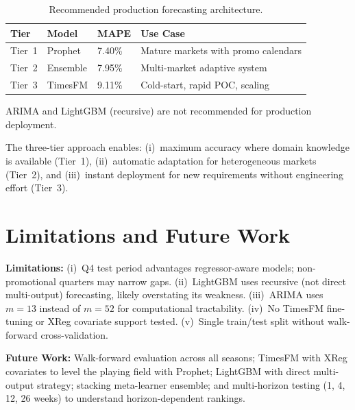 \documentclass[10pt,twocolumn,a4paper]{article}
\begin{document}
\begin{table}[t]
\caption{Recommended production forecasting architecture.}
\label{tab:deployment}
\setlength{\tabcolsep}{24pt}
\renewcommand{\arraystretch}{1.4}
\begin{tabular}{l l l l}
\toprule
\textbf{Tier} & \textbf{Model} & \textbf{MAPE} & \textbf{Use Case} \\
\midrule
Tier~1 & Prophet & 7.40\% & Mature markets with promo calendars \\
Tier~2 & Ensemble & 7.95\% & Multi-market adaptive system \\
Tier~3 & TimesFM & 9.11\% & Cold-start, rapid POC, scaling \\
\bottomrule
\end{tabular}
\begin{flushleft}
\vspace{-2pt}
\scriptsize{ARIMA and LightGBM (recursive) are not recommended for production deployment.}
\end{flushleft}
\end{table}

The three-tier approach enables: (i)~maximum accuracy where domain knowledge is available (Tier~1), (ii)~automatic adaptation for heterogeneous markets (Tier~2), and (iii)~instant deployment for new requirements without engineering effort (Tier~3).

\section{Limitations and Future Work}
\label{sec:limitations}

\textbf{Limitations:} (i)~Q4 test period advantages regressor-aware models; non-promotional quarters may narrow gaps. (ii)~LightGBM uses recursive (not direct multi-output) forecasting, likely overstating its weakness. (iii)~ARIMA uses $m\!=\!13$ instead of $m\!=\!52$ for computational tractability. (iv)~No TimesFM fine-tuning or XReg covariate support tested. (v)~Single train/test split without walk-forward cross-validation.

\textbf{Future Work:} Walk-forward evaluation across all seasons; TimesFM with XReg covariates to level the playing field with Prophet; LightGBM with direct multi-output strategy; stacking meta-learner ensemble; and multi-horizon testing (1, 4, 12, 26 weeks) to understand horizon-dependent rankings.
\end{document}
